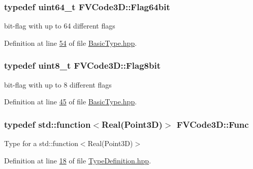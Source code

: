 \subsubsection[{\texorpdfstring{Flag64bit}{Flag64bit}}]{\setlength{\rightskip}{0pt plus 5cm}typedef uint64\+\_\+t {\bf F\+V\+Code3\+D\+::\+Flag64bit}}\hypertarget{namespaceFVCode3D_ab5f86a12f707861f59c32d022209bfb1}{}\label{namespaceFVCode3D_ab5f86a12f707861f59c32d022209bfb1}


bit-\/flag with up to 64 different flags 



Definition at line \hyperlink{BasicType_8hpp_source_l00054}{54} of file \hyperlink{BasicType_8hpp_source}{Basic\+Type.\+hpp}.

\subsubsection[{\texorpdfstring{Flag8bit}{Flag8bit}}]{\setlength{\rightskip}{0pt plus 5cm}typedef uint8\+\_\+t {\bf F\+V\+Code3\+D\+::\+Flag8bit}}\hypertarget{namespaceFVCode3D_a4eac36ed1d93d886ecdcf46c6386b415}{}\label{namespaceFVCode3D_a4eac36ed1d93d886ecdcf46c6386b415}


bit-\/flag with up to 8 different flags 



Definition at line \hyperlink{BasicType_8hpp_source_l00045}{45} of file \hyperlink{BasicType_8hpp_source}{Basic\+Type.\+hpp}.

\subsubsection[{\texorpdfstring{Func}{Func}}]{\setlength{\rightskip}{0pt plus 5cm}typedef std\+::function$<${\bf Real}({\bf Point3D})$>$ {\bf F\+V\+Code3\+D\+::\+Func}}\hypertarget{namespaceFVCode3D_a38fa3b2520ad364d2c3d56ea5077826a}{}\label{namespaceFVCode3D_a38fa3b2520ad364d2c3d56ea5077826a}


Type for a std\+::function$<$\+Real(\+Point3\+D)$>$ 



Definition at line \hyperlink{TypeDefinition_8hpp_source_l00018}{18} of file \hyperlink{TypeDefinition_8hpp_source}{Type\+Definition.\+hpp}.

